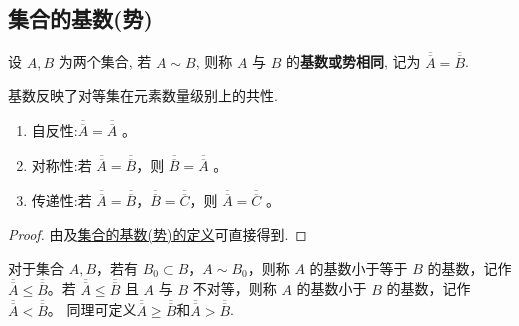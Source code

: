 \documentclass[../../main.tex]{subfiles}
\begin{document}
\subsection{集合的基数(势)}

\begin{definition}[集合的基数(势)]\label{definition:集合的基数(势)}
设 $A, B$ 为两个集合, 若 $A \sim B$, 则称 $A$ 与 $B$ 的\textbf{基数或势相同}, 记为 $\overline{\overline{A}} = \overline{\overline{B}}$.
\end{definition}
\begin{note}
基数反映了对等集在元素数量级别上的共性. 
\end{note}

\begin{theorem}
\begin{enumerate}[(1)]
\item 自反性:$\overline{\overline{A}} = \overline{\overline{A}}$ 。

\item 对称性:若 $\overline{\overline{A}} = \overline{\overline{B}}$，则 $\overline{\overline{B}} = \overline{\overline{A}}$ 。

\item 传递性:若 $\overline{\overline{A}} = \overline{\overline{B}}$，$\overline{\overline{B}} = \overline{\overline{C}}$，则 $\overline{\overline{A}} = \overline{\overline{C}}$ 。
\end{enumerate}
\end{theorem}
\begin{proof}
由及\hyperref[definition:集合的基数(势)]{集合的基数(势)的定义}可直接得到.
\end{proof}

\begin{definition}\label{definition:集合的基数大小关系}
对于集合 $A, B$，若有 $B_0 \subset B$，$A \sim B_0$，则称 $A$ 的基数小于等于 $B$ 的基数，记作 $\overline{\overline{A}} \leqslant\overline{\overline{B}}$。若 $\overline{\overline{A}}\leqslant \overline{\overline{B}}$ 且 $A$ 与 $B$ 不对等，则称 $A$ 的基数小于 $B$ 的基数，记作 $\overline{\overline{A}} < \overline{\overline{B}}$。
同理可定义$\overline{\overline{A}}\geqslant \overline{\overline{B}}$和$\overline{\overline{A}}> \overline{\overline{B}}$.
\end{definition}
\end{document}
